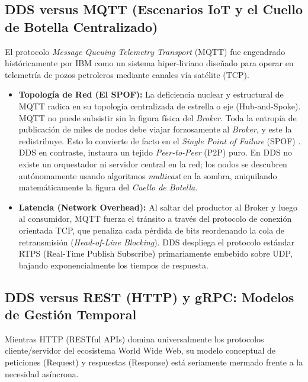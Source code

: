 \documentclass[11pt,a4paper,oneside]{report}
\begin{document}
\subsection{DDS versus MQTT (Escenarios IoT y el Cuello de Botella Centralizado)}
El protocolo \textit{Message Queuing Telemetry Transport} (MQTT) fue engendrado hist\'oricamente por IBM como un sistema hiper-liviano dise\~nado para operar en telemetr\'ia de pozos petroleros mediante canales v\'ia sat\'elite (TCP).
\begin{itemize}
    \item \textbf{Topolog\'ia de Red (El SPOF):} La deficiencia nuclear y estructural de MQTT radica en su topolog\'ia centralizada de estrella o eje (Hub-and-Spoke). MQTT no puede subsistir sin la figura f\'isica del \textit{Broker}. Toda la entrop\'ia de publicaci\'on de miles de nodos debe viajar forzosamente al \textit{Broker}, y este la redistribuye. Esto lo convierte de facto en el \textit{Single Point of Failure} (SPOF) \citep{profanter2019}. DDS en contraste, instaura un tejido \textit{Peer-to-Peer} (P2P) puro. En DDS no existe un orquestador ni servidor central en la red; los nodos se descubren aut\'onomamente usando algoritmos \textit{multicast} en la sombra, aniquilando matem\'aticamente la figura del \textit{Cuello de Botella}.
    \item \textbf{Latencia (Network Overhead):} Al saltar del productor al Broker y luego al consumidor, MQTT fuerza el tr\'ansito a trav\'es del protocolo de conexi\'on orientada TCP, que penaliza cada p\'erdida de bits reordenando la cola de retransmisi\'on (\textit{Head-of-Line Blocking}). DDS despliega el protocolo est\'andar RTPS (Real-Time Publish Subscribe) primariamente embebido sobre UDP, bajando exponencialmente los tiempos de respuesta.
\end{itemize}

\subsection{DDS versus REST (HTTP) y gRPC: Modelos de Gesti\'on Temporal}
Mientras HTTP (RESTful APIs) domina universalmente los protocolos cliente/servidor del ecosistema World Wide Web, su modelo conceptual de peticiones (Request) y respuestas (Response) est\'a seriamente mermado frente a la necesidad as\'incrona. 
\end{document}
